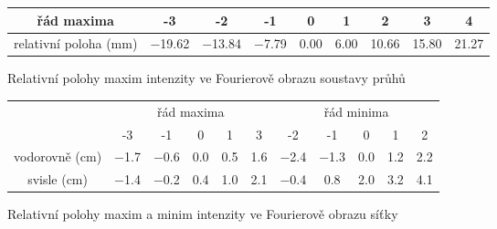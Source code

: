 
\begin{tabulka}[htbp]
\centering
\begin{tabular}{c|cccccccc}
řád maxima  & -3 & -2 & -1 & 0 & 1 & 2 & 3 & 4 \\ \hline
relativní poloha (\si{\mm})  & \num{-19.62} & \num{-13.84} & \num{-7.79} & \num{0.00} & \num{6.00} & \num{10.66} & \num{15.80} & \num{21.27} \\
\end{tabular}
\caption{Relativní polohy maxim intenzity ve Fourierově obrazu soustavy průhů}
\label{t:pruhy}
\end{tabulka}

\begin{tabulka}[htbp]
\centering
\begin{tabular}{c|ccccc||ccccc}
& \multicolumn{5}{c||}{řád maxima} & \multicolumn{5}{c}{řád minima\footnotemark} \\
 &  -3 & -1 & 0 & 1 & 3  & -2 & -1 & 0 & 1 & 2 \\ \hline
vodorovně (\si{\cm})  & \num{-1.7} & \num{-0.6} & \num{0.0} & \num{0.5} & \num{1.6} & \num{-2.4} & \num{-1.3} & \num{0.0} & \num{1.2} & \num{2.2} \\
svisle (\si{\cm})  & \num{-1.4} & \num{-0.2} & \num{0.4} & \num{1.0} & \num{2.1} & \num{-0.4} & \num{0.8} & \num{2.0} & \num{3.2} & \num{4.1} \\
\end{tabular}
\caption{Relativní polohy maxim a minim intenzity ve Fourierově obrazu síťky}
\label{t:sitka}
\end{tabulka}
